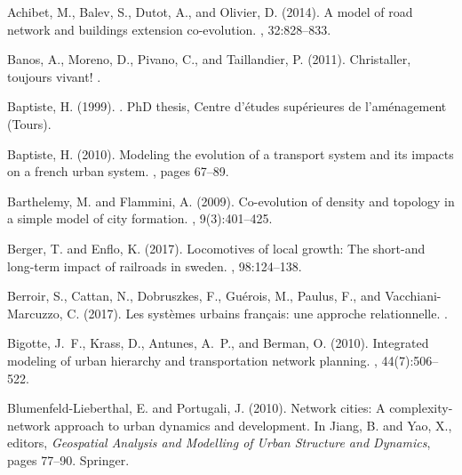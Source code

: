 \documentclass[11pt]{article}
\begin{document}
\begin{thebibliography}{}

Achibet, M., Balev, S., Dutot, A., and Olivier, D. (2014).
\newblock A model of road network and buildings extension co-evolution.
, 32:828--833.

Banos, A., Moreno, D., Pivano, C., and Taillandier, P. (2011).
\newblock Christaller, toujours vivant!
.

Baptiste, H. (1999).
.
\newblock PhD thesis, Centre d'{\'e}tudes sup{\'e}rieures de l'am{\'e}nagement
  (Tours).

Baptiste, H. (2010).
\newblock Modeling the evolution of a transport system and its impacts on a
  french urban system.
, pages
  67--89.

Barthelemy, M. and Flammini, A. (2009).
\newblock Co-evolution of density and topology in a simple model of city
  formation.
, 9(3):401--425.

Berger, T. and Enflo, K. (2017).
\newblock Locomotives of local growth: The short-and long-term impact of
  railroads in sweden.
, 98:124--138.

Berroir, S., Cattan, N., Dobruszkes, F., Gu{\'e}rois, M., Paulus, F., and
  Vacchiani-Marcuzzo, C. (2017).
\newblock Les syst{\`e}mes urbains fran{\c{c}}ais: une approche relationnelle.
.

Bigotte, J.~F., Krass, D., Antunes, A.~P., and Berman, O. (2010).
\newblock Integrated modeling of urban hierarchy and transportation network
  planning.
,
  44(7):506--522.

Blumenfeld-Lieberthal, E. and Portugali, J. (2010).
\newblock Network cities: A complexity-network approach to urban dynamics and
  development.
\newblock In Jiang, B. and Yao, X., editors, {\em Geospatial Analysis and
  Modelling of Urban Structure and Dynamics}, pages 77--90. Springer.


\end{thebibliography}
\end{document}
